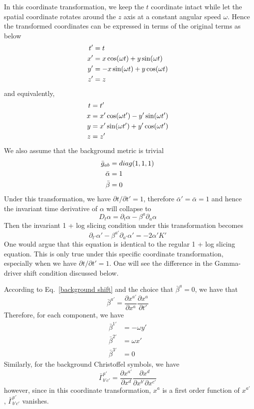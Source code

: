 \documentclass[letterpaper,nofootinbib,prd,amsmath,onecolumn]{revtex4-1}
\begin{document}
In this coordinate transformation, we keep the $t$ coordinate intact while let the spatial coordinate rotates around the $z$ axis at a constant angular speed $\omega$. Hence the transformed coordinates can be expressed in terms of the original terms as below
\begin{align}
t' & = t\notag\\
x' & = x \cos(\omega t) + y\sin(\omega t)\notag\\
y' & = -x\sin(\omega t) + y\cos(\omega t)\notag\\
z' & = z
\end{align}
and equivalently, 
\begin{align}
t & = t'\notag\\
x & = x'\cos(\omega t') - y'\sin(\omega t')\notag\\
y & = x'\sin(\omega t') + y'\cos(\omega t')\notag\\
z & = z'
\end{align}
We also assume that the background metric is trivial
\begin{align}
{\bar g}_{ab} & = diag(1,1,1)\notag\\
{\bar \alpha} & = 1\notag\\
{\bar \beta} & = 0 
\end{align}
Under this transformation, we have $\partial t/\partial t' = 1$, therefore ${\bar \alpha}' = {\bar \alpha} = 1$ and hence the invariant time derivative of $\alpha$ will collapse to
\begin{equation}
D_{t}\alpha = \partial_{t}\alpha - \beta^{a}\partial_{a}\alpha
\end{equation}
Then the invariant 1 + log slicing condition under this transformation becomes
\begin{equation}\label{transformed 1 + log slicing}
\partial_{t'}\alpha' - \beta^{a'}\partial_{a'}\alpha' = -2\alpha'K'
\end{equation}
One would argue that this equation is identical to the regular 1 + log slicing equation. This is only true under this specific coordinate transformation, especially when we have $\partial t/\partial t' = 1$. One will see the difference in the Gamma-driver shift condition discussed below. 

According to Eq.~\ref{background shift} and the choice that ${\bar \beta}^{a} = 0$, we have that
\[
{\bar \beta}^{a'} = \frac{\partial x^{a'}}{\partial x^{a}}\frac{\partial x^{a}}{\partial t'}
\]
Therefore, for each component, we have
\begin{align*}
{\bar \beta}^{1'} & = -\omega y'\\
{\bar \beta}^{2'} & = \omega x'\\
{\bar \beta}^{3'} & = 0
\end{align*}
Similarly, for the background Christoffel symbols, we have
\[
{\bar \Gamma}^{a'}_{b'c'} = \frac{\partial x^{a'}}{\partial x^{d}}\frac{\partial x^{d}}{\partial x^{b'}\partial x^{c'}}
\]
however, since in this coordinate transformation, $x^{a}$ is a first order function of $x^{a'}$, ${\bar \Gamma}^{a'}_{b'c'}$ vanishes. 
\end{document}
